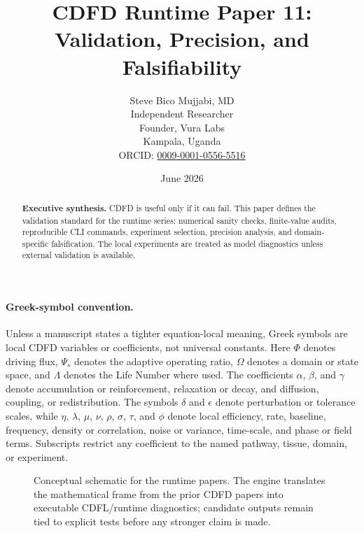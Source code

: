 \documentclass[12pt,a4paper]{article}
\title{\textbf{CDFD Runtime Paper 11: Validation, Precision, and Falsifiability}}
\author{Steve Bico Mujjabi, MD\\
\small Independent Researcher\\
\small Founder, Vura Labs\\
\small Kampala, Uganda\\
\small ORCID: \href{https://orcid.org/0009-0001-0556-5516}{0009-0001-0556-5516}}
\date{June 2026}
\begin{document}
\maketitle

\begin{abstract}
\noindent \textbf{Executive synthesis.} CDFD is useful only if it can fail.
This paper defines the validation standard for the runtime series: numerical
sanity checks, finite-value audits, reproducible CLI commands, experiment
selection, precision analysis, and domain-specific falsification. The local
experiments are treated as model diagnostics unless external validation is
available.
\end{abstract}


\paragraph{Greek-symbol convention.}
Unless a manuscript states a tighter equation-local meaning, Greek symbols are local CDFD variables or coefficients, not universal constants. Here $\Phi$ denotes driving flux, $\Psi_s$ denotes the adaptive operating ratio, $\Omega$ denotes a domain or state space, and $\Lambda$ denotes the Life Number where used. The coefficients $\alpha$, $\beta$, and $\gamma$ denote accumulation or reinforcement, relaxation or decay, and diffusion, coupling, or redistribution. The symbols $\delta$ and $\epsilon$ denote perturbation or tolerance scales, while $\eta$, $\lambda$, $\mu$, $\nu$, $\rho$, $\sigma$, $\tau$, and $\phi$ denote local efficiency, rate, baseline, frequency, density or correlation, noise or variance, time-scale, and phase or field terms. Subscripts restrict any coefficient to the named pathway, tissue, domain, or experiment.

\begin{figure}[ht]
\centering
{}
\caption{Conceptual schematic for the runtime papers. The engine translates the mathematical frame from the prior CDFD papers into executable CDFL/runtime diagnostics; candidate outputs remain tied to explicit tests before any stronger claim is made.}
\end{figure}
\end{document}
